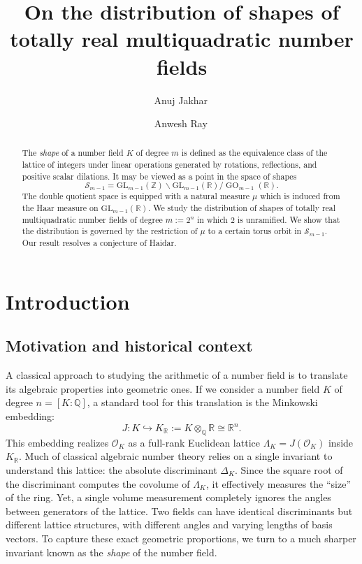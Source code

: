 \documentclass{amsart}
\title[Shapes of multi-quadratic number fields]
{On the distribution of shapes of totally real multiquadratic number fields}
\author[A.~Jakhar]{Anuj Jakhar\, \orcidlink{0009-0007-5951-2261}}
\author[A.~Ray]{Anwesh Ray\, \orcidlink{0000-0001-6946-1559}}
\newcommand{\op}[1]{\operatorname{#1}}
\newcommand{\R}{\mathbb{R}}
\newcommand{\Z}{\mathbb{Z}}
\newcommand{\GL}{\mathrm{GL}}
\theoremstyle{plain}
\theoremstyle{definition}
\theoremstyle{remark}
\numberwithin{equation}{section}
\begin{document}
\maketitle

\begin{abstract}
The \emph{shape} of a number field $K$ of degree $m$ is defined as the
equivalence class of the lattice of integers under linear operations
generated by rotations, reflections, and positive scalar dilations.
It may be viewed as a point in the space of shapes
\[
\mathcal{S}_{m-1}
=
\GL_{m-1}(\Z)\backslash \GL_{m-1}(\R)/\op{GO}_{m-1}(\R).
\] The double quotient space is equipped with a  natural measure $\mu$ which is induced from the Haar measure on $\GL_{m-1}(\R)$. We study the distribution of shapes of totally real multiquadratic number fields of degree $m:=2^n$ in which $2$ is unramified. We show that the distribution is governed by the restriction of $\mu$ to a certain torus orbit in $\mathcal{S}_{m-1}$. Our result resolves a conjecture of Haidar.
\end{abstract}


\section{Introduction}

\subsection{Motivation and historical context} 
A classical approach to studying the arithmetic of a number field is to translate its algebraic properties into geometric ones. If we consider a number field $K$ of degree $n = [K:\mathbb{Q}]$, a standard tool for this translation is the Minkowski embedding: $$J: K \hookrightarrow K_{\mathbb{R}} := K \otimes_{\mathbb{Q}} \mathbb{R} \cong \mathbb{R}^n.$$ This embedding realizes $\mathcal{O}_K$ as a full-rank Euclidean lattice $\Lambda_K = J(\mathcal{O}_K)$ inside $K_{\mathbb{R}}$. Much of classical algebraic number theory relies on a single invariant to understand this lattice: the absolute discriminant $\Delta_K$. Since the square root of the discriminant computes the covolume of $\Lambda_K$, it effectively measures the ``size'' of the ring. Yet, a single volume measurement completely ignores the angles between generators of the lattice. Two fields can have identical discriminants but  different lattice structures, with different angles and varying lengths of basis vectors. To capture these exact geometric proportions, we turn to a much sharper invariant known as the {\it shape} of the number field.
\end{document}
